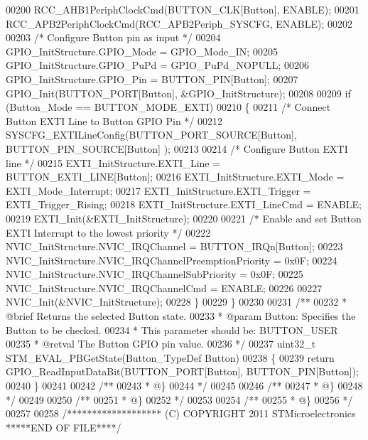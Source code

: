 \begin{DoxyCode}
00200   RCC_AHB1PeriphClockCmd(BUTTON_CLK[Button], ENABLE);
00201   RCC_APB2PeriphClockCmd(RCC_APB2Periph_SYSCFG, ENABLE);
00202 
00203   \textcolor{comment}{/* Configure Button pin as input */}
00204   GPIO\_InitStructure.GPIO_Mode = GPIO_Mode_IN;
00205   GPIO\_InitStructure.GPIO_PuPd = GPIO_PuPd_NOPULL;
00206   GPIO\_InitStructure.GPIO_Pin = BUTTON_PIN[Button];
00207   GPIO_Init(BUTTON_PORT[Button], &GPIO\_InitStructure);
00208 
00209   \textcolor{keywordflow}{if} (Button\_Mode == BUTTON_MODE_EXTI)
00210   \{
00211     \textcolor{comment}{/* Connect Button EXTI Line to Button GPIO Pin */}
00212     SYSCFG_EXTILineConfig(BUTTON_PORT_SOURCE[Button], BUTTON_PIN_SOURCE[Button]
      );
00213 
00214     \textcolor{comment}{/* Configure Button EXTI line */}
00215     EXTI\_InitStructure.EXTI_Line = BUTTON_EXTI_LINE[Button];
00216     EXTI\_InitStructure.EXTI_Mode = EXTI_Mode_Interrupt;
00217     EXTI\_InitStructure.EXTI_Trigger = EXTI_Trigger_Rising;
00218     EXTI\_InitStructure.EXTI_LineCmd = ENABLE;
00219     EXTI_Init(&EXTI\_InitStructure);
00220 
00221     \textcolor{comment}{/* Enable and set Button EXTI Interrupt to the lowest priority */}
00222     NVIC\_InitStructure.NVIC_IRQChannel = BUTTON_IRQn[Button];
00223     NVIC\_InitStructure.NVIC_IRQChannelPreemptionPriority = 0x0F;
00224     NVIC\_InitStructure.NVIC_IRQChannelSubPriority = 0x0F;
00225     NVIC\_InitStructure.NVIC_IRQChannelCmd = ENABLE;
00226 
00227     NVIC_Init(&NVIC\_InitStructure);
00228   \}
00229 \}
00230 
00231 \textcolor{comment}{/**}
00232 \textcolor{comment}{  * @brief  Returns the selected Button state.}
00233 \textcolor{comment}{  * @param  Button: Specifies the Button to be checked.}
00234 \textcolor{comment}{  *   This parameter should be: BUTTON\_USER  }
00235 \textcolor{comment}{  * @retval The Button GPIO pin value.}
00236 \textcolor{comment}{  */}
00237 uint32\_t STM_EVAL_PBGetState(Button\_TypeDef Button)
00238 \{
00239   \textcolor{keywordflow}{return} GPIO_ReadInputDataBit(BUTTON_PORT[Button], BUTTON_PIN[Button]);
00240 \}
00241 
00242 \textcolor{comment}{/**}
00243 \textcolor{comment}{  * @\}}
00244 \textcolor{comment}{  */}
00245 
00246 \textcolor{comment}{/**}
00247 \textcolor{comment}{  * @\}}
00248 \textcolor{comment}{  */}
00249 
00250 \textcolor{comment}{/**}
00251 \textcolor{comment}{  * @\}}
00252 \textcolor{comment}{  */}
00253 
00254 \textcolor{comment}{/**}
00255 \textcolor{comment}{  * @\}}
00256 \textcolor{comment}{  */}
00257 
00258 \textcolor{comment}{/******************* (C) COPYRIGHT 2011 STMicroelectronics *****END OF FILE****/}
\end{DoxyCode}

